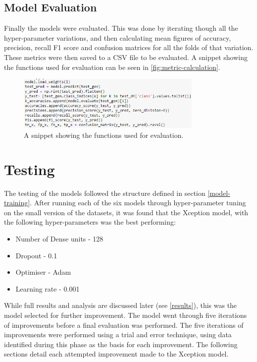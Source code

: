 \subsection{Model Evaluation}
Finally the models were evaluated. This was done by iterating though all the hyper-parameter variations, and then calculating mean figures of accuracy, precision, recall F1 score and confusion matrices for all the folds of that variation. These metrics were then saved to a CSV file to be evaluated. A snippet showing the functions used for evaluation can be seen in \autoref{fig:metric-calculation}.

\begin{figure}[H]
    \centering
    \includegraphics[width=0.8\textwidth]{figures/metric-calculation.png}
    \caption{A snippet showing the functions used for evaluation.}
    \label{fig:metric-calculation}
\end{figure}

\section{Testing}
The testing of the models followed the structure defined in section \ref{model-training}. After running each of the six models through hyper-parameter tuning on the small version of the datasets, it was found that the Xception model, with the following hyper-parameters was the best performing:

\begin{itemize}
    \item Number of Dense units - 128
    \item Dropout - 0.1
    \item Optimiser - Adam
    \item Learning rate - 0.001
\end{itemize}

While full results and analysis are discussed later (see \autoref{results}), this was the model selected for further improvement. The model went through five iterations of improvements before a final evaluation was performed. The five iterations of improvements were performed using a trial and error technique, using data identified during this phase as the basis for each improvement. The following sections detail each attempted improvement made to the Xception model.


